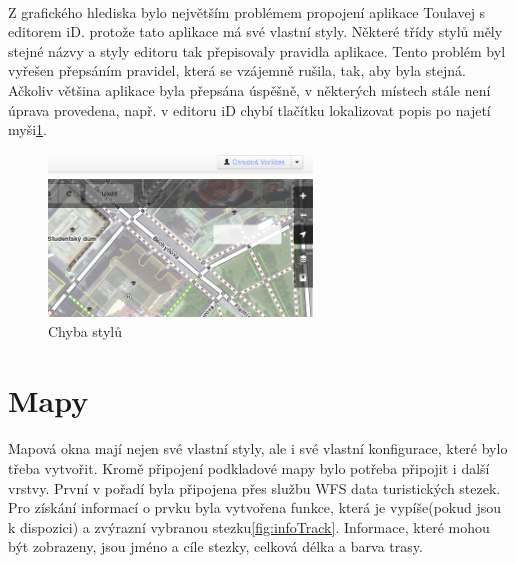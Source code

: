 \documentclass[11pt,a4paper,titlepage,oneside]{book}
\begin{document}
			\paragraph{} Z grafického hlediska bylo největším problémem propojení aplikace Toulavej s editorem iD. protože tato aplikace má své vlastní styly. Některé třídy stylů měly stejné názvy a  styly editoru tak přepisovaly pravidla aplikace. Tento problém byl vyřešen přepsáním pravidel, která se vzájemně rušila, tak, aby byla stejná. Ačkoliv většina aplikace byla přepsána úspěšně, v některých místech stále není úprava provedena, např. v editoru iD chybí tlačítku lokalizovat popis po najetí myši\ref{fig:error_locate}.
		\begin{figure}[!h]
			\begin{center}
				\includegraphics[width=7cm]{obrazky/toulavej/chyba_locate.png}
				\caption{Chyba stylů}
				\label{fig:error_locate}
			\end{center}
		\end{figure}	

		\section{Mapy} %
			\paragraph{} Mapová okna mají nejen své vlastní styly, ale i své vlastní konfigurace, které bylo třeba vytvořit. Kromě připojení podkladové mapy bylo potřeba připojit i další vrstvy. První v pořadí byla připojena přes službu WFS data turistických stezek. Pro získání informací o prvku byla vytvořena funkce, která je vypíše(pokud jsou k dispozici) a zvýrazní vybranou stezku\ref{fig:infoTrack}. Informace, které mohou být zobrazeny, jsou jméno a cíle stezky, celková délka a barva trasy.
\end{document}

